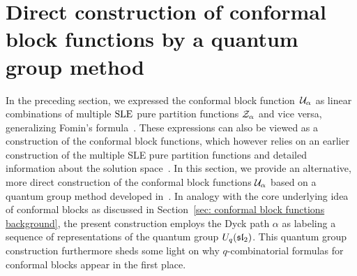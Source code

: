 \documentclass[oneside,english]{amsart}
\numberwithin{equation}{section}
\numberwithin{figure}{section}
\theoremstyle{plain}
\theoremstyle{plain}
\theoremstyle{plain}
\theoremstyle{remark}
\theoremstyle{plain}
\theoremstyle{plain}
\theoremstyle{plain}
\theoremstyle{plain}
\theoremstyle{plain}
\theoremstyle{plain}
\theoremstyle{plain}
\theoremstyle{plain}
\newcommand{\blue}[1]{{\color{blue} #1}}
\begin{document}
\section{Direct construction of conformal block functions by a quantum group method}
\label{sec: construction of conformal block functions}
In the preceding section, we expressed the conformal block function~$\mathcal{U}_\alpha$
as linear combinations of multiple $\mathrm{SLE}$ pure partition functions $\mathcal{Z}_\alpha$ and vice versa, 
generalizing Fomin's formula~\cite{Fomin-LERW_and_total_positivity, KKP-boundary_correlations_in_planar_LERW_and_UST}.
These expressions can also be viewed as a construction of the conformal block functions, which
however relies on an earlier construction of the multiple SLE pure partition
functions and detailed information about the solution
space~\cite{FK-solution_space_for_a_system_of_null_state_PDEs_1,
FK-solution_space_for_a_system_of_null_state_PDEs_2, FK-solution_space_for_a_system_of_null_state_PDEs_3,
KP-pure_partition_functions_of_multiple_SLEs}.
In this section, we provide an alternative, more direct construction of the
conformal block functions $\mathcal{U}_\alpha$ based on a quantum group method developed
in~\cite{KP-conformally_covariant_boundary_correlation_functions_with_a_quantum_group}.
In analogy with the core underlying idea of
conformal blocks as discussed in Section~\ref{sec: conformal block functions background},
the present construction employs the Dyck path $\alpha$
as labeling a sequence of representations of the quantum group ${U}_{q}(\mathfrak{sl}_{2})$.
This quantum group construction furthermore sheds some light on why $q$-combinatorial
formulas for conformal blocks appear in the first place.
\end{document}
